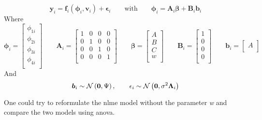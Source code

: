 \documentclass[a4paper,12pt]{article}
\begin{document}
	\subsection{}
	\begin{equation*}
		\boldsymbol{y}_i = \boldsymbol{f}_i\left(\boldsymbol{\phi}_i,\boldsymbol{v}_i\right) + \boldsymbol{\epsilon}_i \qquad \text{with} \qquad \boldsymbol{\phi}_i = \boldsymbol{A}_i \boldsymbol{\beta} + \boldsymbol{B}_i \boldsymbol{b}_i
	\end{equation*}
	Where
	\begin{equation*}
		\boldsymbol{\phi}_i = \begin{bmatrix}
		\phi_{1i} \\
		\phi_{2i} \\
		\phi_{3i} \\
		\phi_{4i} \\
		\end{bmatrix}
		\qquad
		\boldsymbol{A}_i = \begin{bmatrix}
		1 & 0 & 0 & 0 \\
		0 & 1 & 0 & 0 \\
		0 & 0 & 1 & 0 \\
		0 & 0 & 0 & 1 \\
		\end{bmatrix}
		\qquad
		\boldsymbol{\beta} = \begin{bmatrix}
		A \\
		B \\
		C \\
		w \\
		\end{bmatrix}
		\qquad
		\boldsymbol{B}_i = \begin{bmatrix}
		1 \\
		0 \\
		0 \\
		0 \\
		\end{bmatrix}
		\qquad
		\boldsymbol{b}_i = \begin{bmatrix}
		A \\
		\end{bmatrix}
	\end{equation*}
	And
	\begin{equation*}
		\boldsymbol{b}_i \sim \mathcal{N}\left(\boldsymbol{0}, 
		\Psi \\\right),
		\qquad
		\epsilon_{i} \sim \mathcal{N}\left(\boldsymbol{0}, \sigma^2 \boldsymbol{\Lambda}_i\right)
	\end{equation*}
	
	One could try to reformulate the nlme model without the parameter \textit{w} and compare the two models using anova.
	
\end{document}
